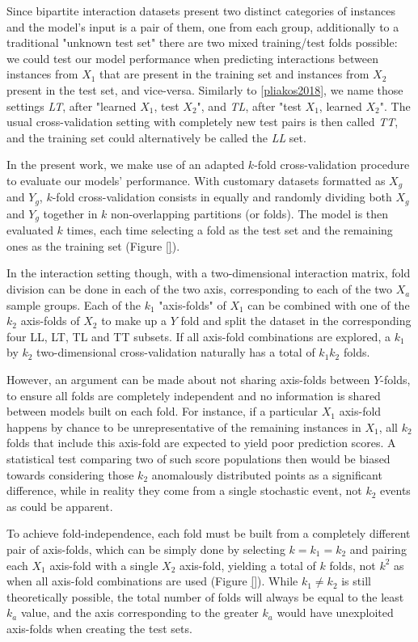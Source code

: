 Since bipartite interaction datasets present two distinct categories of instances and the model's input is a pair of them, one from each group, additionally to a traditional "unknown test set" there are two mixed training/test folds possible: we could test our model performance when predicting interactions between instances from $X_1$ that are present in the training set and instances from $X_2$ present in the test set, and vice-versa. Similarly to \ref{pliakos2018}, %
we name those settings \emph{LT}, after "learned $X_1$, test $X_2$", and \emph{TL}, after "test $X_1$, learned $X_2$". The usual cross-validation setting with completely new test pairs is then called \emph{TT}, and the training set could alternatively be called the \emph{LL} set.

In the present work, we make use of an adapted $k$-fold cross-validation procedure to evaluate our models' performance. With customary datasets formatted as $X_g$ and $Y_g$, $k$-fold cross-validation consists in equally and randomly dividing both $X_g$ and $Y_g$ together in $k$ non-overlapping partitions (or folds). The model is then evaluated $k$ times, each time selecting a fold as the test set and the remaining ones as the training set (Figure \ref{}).

In the interaction setting though, with a two-dimensional interaction matrix, fold division can be done in each of the two axis, corresponding to each of the two $X_a$ sample groups. Each of the $k_1$ "axis-folds" of $X_1$ can be combined with one of the $k_2$ axis-folds of $X_2$ to make up a $Y$ fold and split the dataset in the corresponding four LL, LT, TL and TT subsets. If all axis-fold combinations are explored, a $k_1$ by $k_2$ two-dimensional cross-validation naturally has a total of $k_1k_2$ folds. 

However, an argument can be made about not sharing axis-folds between $Y$-folds, to ensure all folds are completely independent and no information is shared between models built on each fold. For instance, if a particular $X_1$ axis-fold happens by chance to be unrepresentative of the remaining instances in $X_1$, all $k_2$ folds that include this axis-fold are expected to yield poor prediction scores. A statistical test comparing two of such score populations then would be biased towards considering those $k_2$ anomalously distributed points as a significant difference, while in reality they come from a single stochastic event, not $k_2$ events as could be apparent.

To achieve fold-independence, each fold must be built from a completely different pair of axis-folds, which can be simply done by selecting $k=k_1=k_2$ and pairing each $X_1$ axis-fold with a single $X_2$ axis-fold, yielding a total of $k$ folds, not $k^2$ as when all axis-fold combinations are used (Figure \ref{}). While $k_1\neq k_2$ is still theoretically possible, the total number of folds will always be equal to the least $k_a$ value, and the axis corresponding to the greater $k_a$ would have unexploited axis-folds when creating the test sets.

